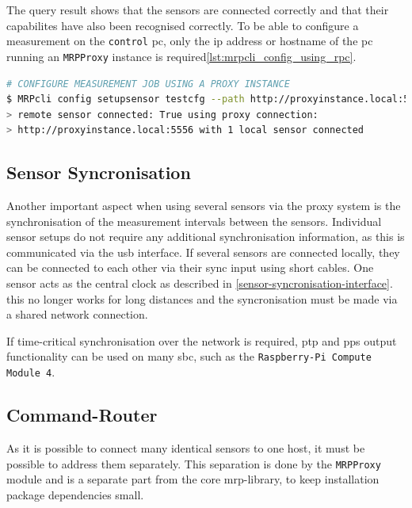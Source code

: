 The query result shows that the sensors are connected correctly and that
their capabilites have also been recognised correctly. To be able to
configure a measurement on the \passthrough{\lstinline!control!}
\gls{pc}, only the \gls{ip} address or hostname of the \gls{pc} running
an \passthrough{\lstinline!MRPProxy!} instance is
required\ref{lst:mrpcli_config_using_rpc}.

\begin{lstlisting}[language=bash, caption={MRPcli usage example to connect with a network sensor}, label=lst:mrpcli_config_using_rpc]
# CONFIGURE MEASUREMENT JOB USING A PROXY INSTANCE
$ MRPcli config setupsensor testcfg --path http://proxyinstance.local:5556
> remote sensor connected: True using proxy connection:
> http://proxyinstance.local:5556 with 1 local sensor connected
\end{lstlisting}

\hypertarget{sensor-syncronisation}{%
\subsection{Sensor Syncronisation}\label{sensor-syncronisation}}

Another important aspect when using several sensors via the proxy system
is the synchronisation of the measurement intervals between the sensors.
Individual sensor setups do not require any additional synchronisation
information, as this is communicated via the \gls{usb} interface. If
several sensors are connected locally, they can be connected to each
other via their sync input using short cables. One sensor acts as the
central clock as described in \ref{sensor-syncronisation-interface}.
this no longer works for long distances and the syncronisation must be
made via a shared network connection.

If time-critical synchronisation over the network is required, \gls{ptp}
and \gls{pps} output functionality\cite{PTPIEEE1588} can be used on
many \gls{sbc}, such as the
\passthrough{\lstinline!Raspberry-Pi Compute Module 4!}.

\hypertarget{command-router}{%
\subsection{Command-Router}\label{command-router}}

As it is possible to connect many identical sensors to one host, it must
be possible to address them separately. This separation is done by the
\passthrough{\lstinline!MRPProxy!} module and is a separate part from
the core \gls{mrp}-library, to keep installation package dependencies
small.

